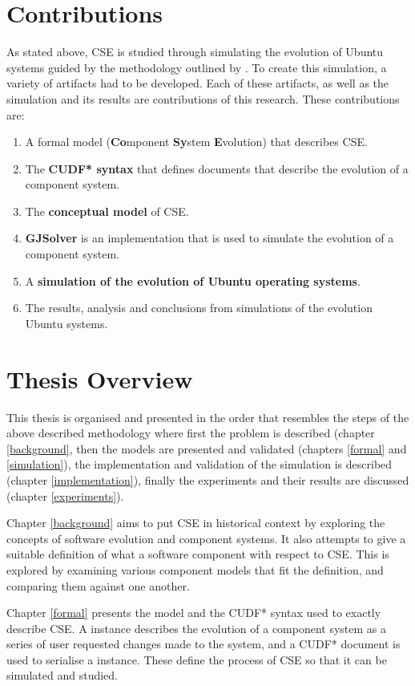 \section{Contributions}
As stated above, CSE is studied through simulating the evolution of Ubuntu systems guided by the methodology outlined by \cite{Law2005}.
To create this simulation, a variety of artifacts had to be developed.
Each of these artifacts, as well as the simulation and its results are contributions of this research. 
These contributions are:
\begin{enumerate}
  \item A formal model \textbf{\modelname} (\textbf{Co}mponent \textbf{Sy}stem \textbf{E}volution) that describes CSE. 
  \item The \textbf{CUDF* syntax} that defines documents that describe the evolution of a component system.
  \item The \textbf{conceptual model} of CSE.
  \item \textbf{GJSolver} is an implementation that is used to simulate the evolution of a component system.
  \item A \textbf{simulation of the evolution of Ubuntu operating systems}.
  \item The results, analysis and conclusions from simulations of the evolution Ubuntu systems.
\end{enumerate}

\section{Thesis Overview}
This thesis is organised and presented in the order that resembles the steps of the above described methodology
where first the problem is described (chapter \ref{background}, then the models are presented and validated (chapters \ref{formal} and \ref{simulation}),
the implementation and validation of the simulation is described (chapter \ref{implementation}), finally the experiments and their results are discussed (chapter \ref{experiments}).  

Chapter \ref{background} aims to put CSE in historical context by exploring the concepts of software evolution and component systems.
It also attempts to give a suitable definition of what a software component with respect to CSE.
This is explored by examining various component models that fit the definition, and comparing them against one another.

Chapter \ref{formal} presents the \modelname model and the CUDF* syntax used to exactly describe CSE.
A \modelname instance describes the evolution of a component system as a series of user requested changes made to the system,
and a CUDF* document is used to serialise a \modelname instance.
These define the process of CSE so that it can be simulated and studied.

